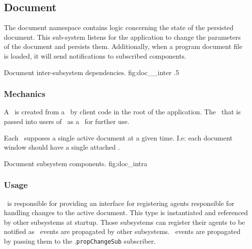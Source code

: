 \newcommand{\docarea}[3]{
      \index{#1}\pbodyitem{#2}{#3}
}

\newcommand{\extparamref}[3]{
      \index{#1}\pbodyitem{#2}{#3}
}

\subsection{Document}
The document namespace contains logic concerning the state of the persisted document.
This sub-system listens for the application to change the parameters of the document and persists them.
Additionally, when a program document file is loaded, it will send notifications to subscribed components.

{Document inter-subsystem dependencies.}
{fig:doc__inter}
{.5}


\subsubsection{Mechanics}
A \docsftype\ is created from a \docsfftype\ by client code in the root of the application.
The \docsftype\ that is passed into users of \docmod\ as a \docftype\ for further use.

Each \docftype\ supposes a single active document at a given time.
I.e: each document window should have a single attached \docftype.

{Document subsystem components.}
{fig:doc_intra}



\subsubsection{Usage}
\docftype\ is responsible for providing an interface for registering agents responsible for handling changes to the active document.
This type is instantiated and referenced by other subsystems at startup.
Those subsystems can register their agents to be notified as \docpctype\ events are propagated by other subsystems.
\docpctype\ events are propagated by passing them to the \docftype .\texttt{propChangeSub} subscriber.